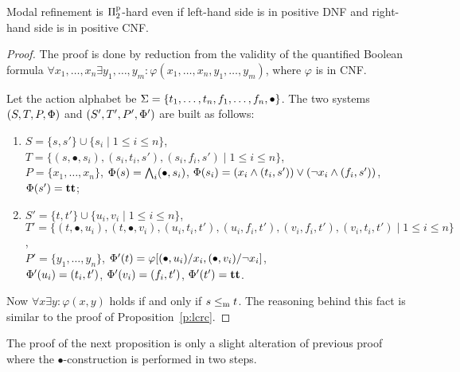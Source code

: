 \begin{proposition}\label{p:ldrc}
Modal refinement is $\mathrm\Pi^\mathrm p_2$-hard even if left-hand side is in positive DNF and
right-hand side is in positive CNF.
\end{proposition}
\begin{proof}
The proof is done by reduction from the validity of the
quantified Boolean formula
 $\forall x_1, \ldots, x_n \exists y_1, \ldots, y_m : 
 \varphi(x_1, \ldots, x_n, y_1, \ldots, y_m)$, where $\varphi$ is in CNF.

 Let the action alphabet be $\mathrm{\Sigma} = \{ t_1, \ldots, t_n, f_1, \ldots, f_n, \bullet \}$.
The two systems $(S,T,P,\mathrm{\Phi})$ and $(S',T',P',\mathrm{\Phi}')$ are built as
follows: 
\begin{enumerate}
    \item $S = \{s,s' \} \cup \{s_i \mid 1 \le i \le n\}$,
$T=\{(s,\bullet,s_i), (s_i, t_i, s'), (s_i, f_i, s') \mid 1 \le i \le n\}$, \\
$P =  \{ x_1, \ldots, x_n\}$,
 $\mathrm{\Phi}(s) = \bigwedge_i (\bullet,s_i)$,
 $\mathrm{\Phi}(s_i) = (x_i \wedge (t_i,s')) \vee (\neg x_i \wedge (f_i,s'))$,
 $\mathrm{\Phi}(s') = \mathbf{tt}$;

\item 
$S' = \{t,t' \} \cup \{u_i,v_i \mid 1 \le i \le n \}$,\\
$T' = \{(t,\bullet,u_i), (t,\bullet,v_i), (u_i,t_i,t'), (u_i,f_i,t'),\allowbreak (v_i,f_i,t'), (v_i,t_i,t') \mid 1 \le i \le n\}$,\\
$P' = \{y_1, \ldots, y_n \}$,
$\mathrm{\Phi}'(t) = \varphi[(\bullet,u_i)/x_i,(\bullet,v_i)/\neg x_i]$,\\
 $\mathrm{\Phi}'(u_i) = (t_i,t')$, $\mathrm{\Phi}'(v_i) = (f_i,t')$, $\mathrm{\Phi}'(t') = \mathbf{tt}$.
\end{enumerate}

 Now $\forall x \exists y : \varphi(x,y)$ holds if
 and only if $s \le_\mathrm m t$.
 The reasoning behind this fact is similar to the proof of
 Proposition~\ref{p:lcrc}.

\end{proof}

The proof of the next proposition is only a slight alteration of previous proof where the $\bullet$-construction is performed in two steps.

